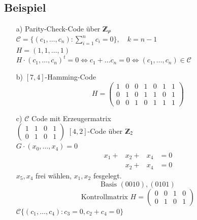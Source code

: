 \subsection{Beispiel}
\begin{itemize}
	\item [a)] Parity-Check-Code \"uber $\Z_p$ \\
	$\mathcal{C} = \lbrace (c_1,\ldots,c_n): \sum^n_{i=1}{c_i}=0 \rbrace,\quad k=n-1$\\
	$H=(1,1,\ldots,1)$\\
	$H \cdot (c_1,\ldots,c_n)^t = 0 \Leftrightarrow c_1 + \ldots c_n = 0 \Leftrightarrow (c_1,\ldots,c_n) \in \mathcal{C}$
	\item [b)] $[7,4]$-Hamming-Code \\
	\[	H=
		\begin{pmatrix}
			1 & 0 & 0 & 1 & 0 & 1 & 1\\
			0 & 1 & 0 & 1 & 1 & 0 & 1\\
			0 & 0 & 1 & 0 & 1 & 1 & 1
		\end{pmatrix}
	\]
	\item [c)] $\mathcal{C}$ Code mit Erzeugermatrix\\
	$
	\begin{pmatrix}
		1 & 1 & 0 & 1\\
		0 & 1 & 0 & 1
	\end{pmatrix}$
	 $[4,2]$-Code \"uber $\Z_2$\\
	 $G \cdot (x_0,\ldots,x_4)=0$
	 \begin{align*}
	 	x_1+&x_2 + &x_4&=0\\
	 	&x_2 + &x_4 &=0
	\end{align*}
	$x_5,x_4$ frei w\"ahlen, $x_1,x_2$ fesgelegt.\\
	\[
		\text{Basis }
		(0 0 1 0), (0 1 0 1)
	\]	
	\[
		\text{Kontrollmatrix }
		H=
		\begin{pmatrix}
			0 & 0 & 1 & 0 \\
			0 & 1 & 0 & 1
		\end{pmatrix}
	\]
	$\mathcal{C} \lbrace (c_1,\ldots,c_4) : c_3=0,c_2+c_4=0\rbrace$	
\end{itemize}
